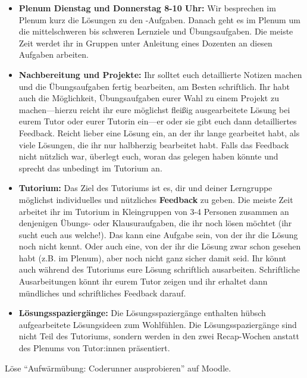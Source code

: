 \documentclass{uebung_cs}
\begin{document}
\begin{exercise}
\begin{enumerate}
\begin{itemize}
      \item\textbf{Plenum Dienstag und Donnerstag 8-10 Uhr:}
      Wir besprechen im Plenum kurz die Lösungen zu den \intro-Aufgaben.
      Danach geht es im Plenum um die mittelschweren bis schweren Lernziele und Übungsaufgaben.
      Die meiste Zeit werdet ihr in Gruppen unter Anleitung eines Dozenten an diesen Aufgaben arbeiten.
      \item\textbf{Nachbereitung und Projekte:}
      Ihr solltet euch detaillierte Notizen machen und die Übungsaufgaben fertig bearbeiten, am Besten schriftlich.
      Ihr habt auch die Möglichkeit, Übungsaufgaben eurer Wahl zu einem Projekt zu machen---hierzu reicht ihr eure möglichst fleißig ausgearbeitete Lösung bei eurem Tutor oder eurer Tutorin ein---er oder sie gibt euch dann detailliertes Feedback.
      Reicht lieber eine Lösung ein, an der ihr lange gearbeitet habt, als viele Lösungen, die ihr nur halbherzig bearbeitet habt.
      Falls das Feedback nicht nützlich war, überlegt euch, woran das gelegen haben könnte und sprecht das unbedingt im Tutorium an.
      \item\textbf{Tutorium:}
      Das Ziel des Tutoriums ist es, dir und deiner Lerngruppe möglichst individuelles und nützliches \textbf{Feedback} zu geben.
      Die meiste Zeit arbeitet ihr im Tutorium in Kleingruppen von 3-4 Personen zusammen an denjenigen Übungs- oder Klausuraufgaben, die ihr noch lösen möchtet (ihr sucht euch aus welche!).
      Das kann eine Aufgabe sein, von der ihr die Lösung noch nicht kennt.
      Oder auch eine, von der ihr die Lösung zwar schon gesehen habt (z.B. im Plenum), aber noch nicht ganz sicher damit seid.
      Ihr könnt auch während des Tutoriums eure Lösung schriftlich ausarbeiten. Schriftliche Ausarbeitungen könnt ihr eurem Tutor zeigen und ihr erhaltet dann mündliches und schriftliches Feedback darauf.
      \item\textbf{Lösungsspaziergänge:}
      Die Lösungsspaziergänge enthalten hübsch aufgearbeitete Lösungsideen zum Wohlfühlen.
      Die Lösungsspaziergänge sind nicht Teil des Tutoriums, sondern werden in den zwei Recap-Wochen anstatt des Plenums von Tutor:innen präsentiert.
    \end{itemize}
    \end{enumerate}
\end{exercise}

\newpage
\begin{exercise}
  Löse \enquote{Aufwärmübung: Coderunner ausprobieren} auf Moodle.
\end{exercise}
\end{document}
